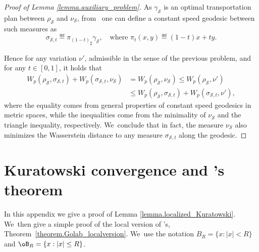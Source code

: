 \begin{proof}[Proof of Lemma \ref{lemma.auxiliary_problem}]
As $\gamma_{\mathcal{S}}$ is an optimal transportation plan between $\rho_{\mathcal{S}}$ and $\nu_{\mathcal{S}}$, from~\cite[Th.\,5.27]{santambrogio2015optimal} one can define a constant speed geodesic between such measures as
\begin{equation*}
\sigma_{\mathcal{S},t} \eqdef {\pi_{(1-t)}}_\sharp\gamma_{\mathcal{S}}, \quad\text{where } \pi_t(x,y) \eqdef (1-t)x + ty.
\end{equation*}

Hence for any variation $\nu'$, admissible in the sense of the previous problem, and for any $t \in [0,1]$, it holds that
\begin{align*}
W_p\left(\rho_{\mathcal{S}}, \sigma_{\mathcal{S},t}\right) + W_p\left(\sigma_{\mathcal{S},t}, \nu_{\mathcal{S}}\right)
&=
W_p\left(\rho_{\mathcal{S}}, \nu_{\mathcal{S}}\right)
\le W_p\left(\rho_{\mathcal{S}}, \nu'\right)\\
&\le W_p\left(\rho_{\mathcal{S}}, \sigma_{\mathcal{S},t}\right) + W_p(\sigma_{\mathcal{S},t}, \nu'),
\end{align*}
where the equality comes from general properties of constant speed geodesics in metric spaces, while the inequalities come from the minimality of $\nu_{\mathcal{S}}$ and the triangle inequality, respectively. We~conclude that in fact, the measure $\nu_{\mathcal{S}}$ also minimizes the Wasserstein distance to any measure $\sigma_{\mathcal{S},t}$ along the geodesic.
\end{proof}

\section{Kuratowski convergence and \Golab's theorem}\label{appendix.kuratowski_convergence}
In this appendix we give a proof of Lemma \ref{lemma.localized_Kuratowski}. We~then give a simple proof
of the local version of \Golab's, Theorem~\ref{theorem.Golab_localversion}. We~use the notation $B_R=\{x: |x|<R\}$ and $\oB_R = \{x:|x|\le R\}$.

